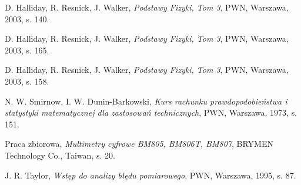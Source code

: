 \documentclass[10pt,a4paper]{article}
\begin{document}
\begin{center}
\begin{thebibliography}{9}

 D. Halliday, R. Resnick, J. Walker,
  \emph{Podstawy Fizyki, Tom 3},
  PWN, Warszawa, 2003, s. 140.
  
 D. Halliday, R. Resnick, J. Walker,
  \emph{Podstawy Fizyki, Tom 3},
  PWN, Warszawa, 2003, s. 165.
  
 D. Halliday, R. Resnick, J. Walker,
  \emph{Podstawy Fizyki, Tom 3},
  PWN, Warszawa, 2003, s. 158.
  
  N. W. Smirnow, I. W. Dunin-Barkowski,
  \emph{Kurs rachunku prawdopodobieństwa i statystyki matematycznej dla zastosowań technicznych},
  PWN, Warszawa, 1973, s. 151.
  
  Praca zbiorowa,
  \emph{Multimetry cyfrowe BM805, BM806T, BM807},
  BRYMEN Technology Co., Taiwan, s. 20.
  
 J. R. Taylor,
 \emph{Wstęp do analizy błędu pomiarowego},
 PWN, Warszawa, 1995, s. 87.
  
  \end{thebibliography}
\end{center}
\end{document}
